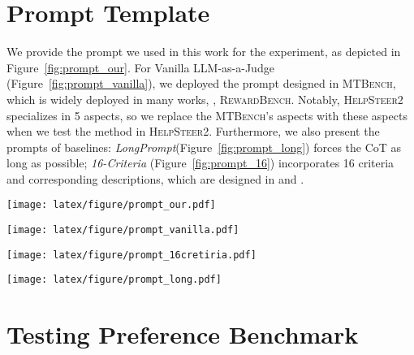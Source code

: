 
\section{Prompt Template}
\label{sec:appendix_prompt}

We provide the prompt we used in this work for the experiment, as depicted in Figure~\ref{fig:prompt_our}. For Vanilla LLM-as-a-Judge (Figure~\ref{fig:prompt_vanilla}), we deployed the prompt designed in \textsc{MTBench}, which is widely deployed in many works, \eg, \textsc{RewardBench}. Notably, \textsc{HelpSteer2} specializes in 5 aspects, so we replace the \textsc{MTBench}'s aspects with these aspects when we test the method in \textsc{HelpSteer2}. Furthermore, we also present the prompts of baselines: \textit{LongPrompt}(Figure~\ref{fig:prompt_long}) forces the CoT as long as possible; \textit{16-Criteria} (Figure~\ref{fig:prompt_16}) incorporates 16 criteria and corresponding descriptions, which are designed in \citet{hu2024arellm} and \citet{wang2024helpsteer}.

\begin{figure*}[!t]
  \texttt{[image: latex/figure/prompt\_our.pdf]}
  \caption {Prompt of Our Method.}
  \label{fig:prompt_our}
\end{figure*}

\begin{figure*}[!t]
  \texttt{[image: latex/figure/prompt\_vanilla.pdf]}
  \caption {Prompt of Vanilla LLM-as-a-Judge.}
  \label{fig:prompt_vanilla}
\end{figure*}

\begin{figure*}[!t]
  \texttt{[image: latex/figure/prompt\_16cretiria.pdf]}
  \caption {Prompt of 16-Criteria LLM-as-a-Judge.}
  \label{fig:prompt_16}
\end{figure*}

\begin{figure*}[!t]
  \texttt{[image: latex/figure/prompt\_long.pdf]}
  \caption {Prompt of LongPrompt LLM-as-a-Judge.}
  \label{fig:prompt_long}
\end{figure*}


\section{Testing Preference Benchmark}
\label{sec:testing}

